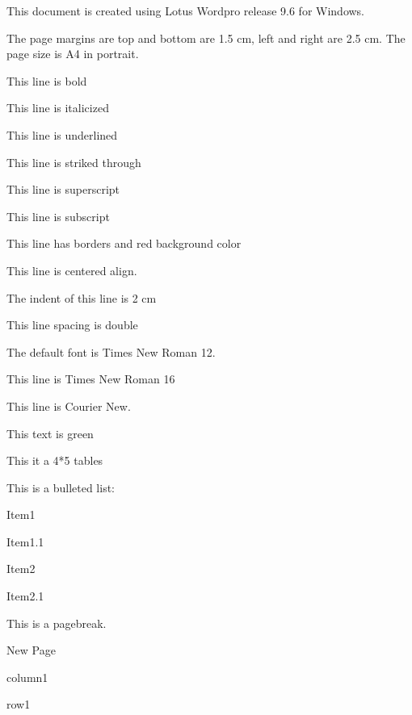 \documentclass[11pt,a4paper]{article}
\begin{document}
This document is created using Lotus Wordpro release 9.6 for Windows.

The page margins are top and bottom are 1.5 cm, left and right are 2.5 cm. The page size is A4 in portrait.

This line is bold

This line is italicized

This line is underlined

This line is striked through

This line is superscript

This line is subscript

This line has borders and red background color

This line is centered align.

The indent of this line is 2 cm

This line spacing is double

The default font is Times New Roman 12.

This line is Times New Roman 16

This line is Courier New.

This text is green

This it a 4*5 tables

This is a bulleted list:

Item1

Item1.1

Item2

Item2.1

This is a pagebreak.

New Page

column1

row1
\end{document}
